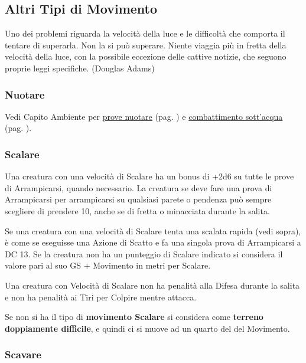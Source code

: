 \begin{multicols}{2}
\subsection{Altri Tipi di Movimento}

\begin{enfasi}{
Uno dei problemi riguarda la velocità della luce e le difficoltà che comporta il tentare di superarla. Non la si può superare. Niente viaggia più in fretta della velocità della luce, con la possibile eccezione delle cattive notizie, che seguono proprie leggi specifiche. (Douglas Adams)
}\end{enfasi}

\label{altri-tipi-di-movimento}

\subsubsection{Nuotare}\label{nuotare}

Vedi Capito Ambiente per \hyperlink{pericoli-dellacqua}{prove nuotare} (pag. \pageref{pericoli-dellacqua}) e \hyperlink{combatteresottacqua}{combattimento sott'acqua} (pag. \pageref{combatteresottacqua}).

\subsubsection{Scalare}\label{scalare}

Una creatura con una velocità di Scalare ha un bonus di +2d6 su tutte le prove di Arrampicarsi, quando necessario. La creatura se deve fare una prova di Arrampicarsi per arrampicarsi su qualsiasi parete o pendenza può sempre scegliere di prendere 10, anche se di fretta o minacciata durante la salita.

Se una creatura con una velocità di Scalare tenta una scalata rapida (vedi sopra), è come se eseguisse una Azione di Scatto e fa una singola prova di Arrampicarsi a DC 13. Se la creatura non ha un punteggio di Scalare indicato si considera il valore pari al suo GS + Movimento in metri per Scalare.

Una creatura con Velocità di Scalare non ha penalità alla Difesa durante la salita e non ha penalità ai Tiri per Colpire mentre attacca.

Se non si ha il tipo di \textbf{movimento Scalare} si considera come \textbf{terreno doppiamente difficile}, e quindi ci si muove ad un quarto del del Movimento.

\subsubsection{Scavare}\label{scavare}


\end{multicols}
